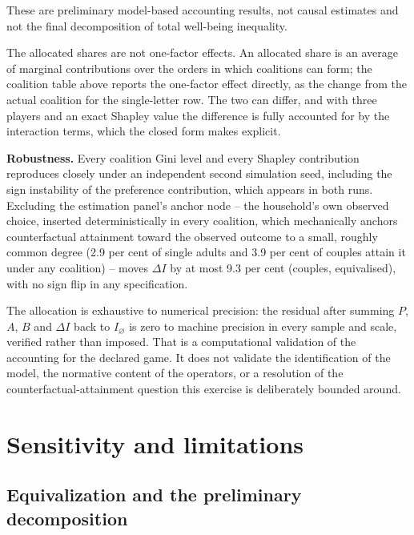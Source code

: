 \documentclass[11pt,a4paper]{article}
\begin{document}
These are preliminary model-based accounting results, not causal estimates and not the final decomposition of total well-being inequality.

The allocated shares are not one-factor effects. An allocated share is an average of marginal contributions over the orders in which coalitions can form; the coalition table above reports the one-factor effect directly, as the change from the actual coalition for the single-letter row. The two can differ, and with three players and an exact Shapley value the difference is fully accounted for by the interaction terms, which the closed form makes explicit.

\textbf{Robustness.} Every coalition Gini level and every Shapley contribution reproduces closely under an independent second simulation seed, including the sign instability of the preference contribution, which appears in both runs. Excluding the estimation panel's anchor node -- the household's own observed choice, inserted deterministically in every coalition, which mechanically anchors counterfactual attainment toward the observed outcome to a small, roughly common degree (2.9 per cent of single adults and 3.9 per cent of couples attain it under any coalition) -- moves \(\Delta I\) by at most 9.3 per cent (couples, equivalised), with no sign flip in any specification.

The allocation is exhaustive to numerical precision: the residual after summing \(P\), \(A\), \(B\) and \(\Delta I\) back to \(I_\varnothing\) is zero to machine precision in every sample and scale, verified rather than imposed. That is a computational validation of the accounting for the declared game. It does not validate the identification of the model, the normative content of the operators, or a resolution of the counterfactual-attainment question this exercise is deliberately bounded around.

\section{Sensitivity and limitations}\label{sensitivity-and-limitations}

\subsection{Equivalization and the preliminary decomposition}\label{equivalization-and-the-preliminary-decomposition}
\end{document}

